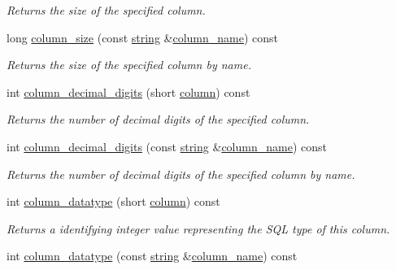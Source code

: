 \begin{DoxyCompactItemize}
\begin{DoxyCompactList}\small\item\em Returns the size of the specified column. \end{DoxyCompactList}\item 
long \mbox{\hyperlink{classnanodbc_1_1result_a43c42071bf86c4532039b61ad3f3c6c6}{column\+\_\+size}} (const \mbox{\hyperlink{namespacenanodbc_abfc0ece56278e590911ec8352774c212}{string}} \&\mbox{\hyperlink{classnanodbc_1_1result_a2bd3fc4e416108960c4191b2cbba256b}{column\+\_\+name}}) const
\begin{DoxyCompactList}\small\item\em Returns the size of the specified column by name. \end{DoxyCompactList}\item 
int \mbox{\hyperlink{classnanodbc_1_1result_aa2568f3d624d65a9f850880e1d2747f8}{column\+\_\+decimal\+\_\+digits}} (short \mbox{\hyperlink{classnanodbc_1_1result_ae4e254b2db63c65473cc058de3d5a844}{column}}) const
\begin{DoxyCompactList}\small\item\em Returns the number of decimal digits of the specified column. \end{DoxyCompactList}\item 
int \mbox{\hyperlink{classnanodbc_1_1result_aabbb9fb0a14a5b0fbb33fda4a1143b78}{column\+\_\+decimal\+\_\+digits}} (const \mbox{\hyperlink{namespacenanodbc_abfc0ece56278e590911ec8352774c212}{string}} \&\mbox{\hyperlink{classnanodbc_1_1result_a2bd3fc4e416108960c4191b2cbba256b}{column\+\_\+name}}) const
\begin{DoxyCompactList}\small\item\em Returns the number of decimal digits of the specified column by name. \end{DoxyCompactList}\item 
int \mbox{\hyperlink{classnanodbc_1_1result_a8adc601a07a055f15908724e285133bb}{column\+\_\+datatype}} (short \mbox{\hyperlink{classnanodbc_1_1result_ae4e254b2db63c65473cc058de3d5a844}{column}}) const
\begin{DoxyCompactList}\small\item\em Returns a identifying integer value representing the S\+QL type of this column. \end{DoxyCompactList}\item 
int \mbox{\hyperlink{classnanodbc_1_1result_af698d05f12656b6ab0809b0a60ea9a60}{column\+\_\+datatype}} (const \mbox{\hyperlink{namespacenanodbc_abfc0ece56278e590911ec8352774c212}{string}} \&\mbox{\hyperlink{classnanodbc_1_1result_a2bd3fc4e416108960c4191b2cbba256b}{column\+\_\+name}}) const

\end{DoxyCompactItemize}
